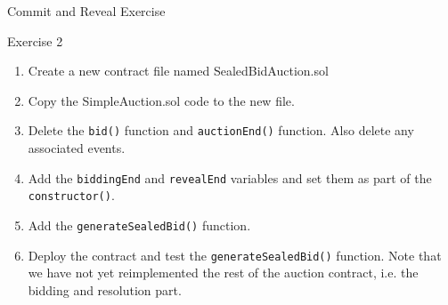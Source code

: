 \documentclass[]{beamer}
\begin{document}
\begin{frame}{Commit and Reveal Exercise}

	\begin{exercise}{Exercise 2}
		\begin{enumerate}
			\item Create a new contract file named SealedBidAuction.sol
			\item Copy the SimpleAuction.sol code to the new file.
			\item Delete the \texttt{bid()} function and \texttt{auctionEnd()} function. Also delete any associated events.
			\item Add the \texttt{biddingEnd} and \texttt{revealEnd} variables and set them as part of the \texttt{constructor()}.
			\item Add the \texttt{generateSealedBid()} function.
			\item Deploy the contract and test the \texttt{generateSealedBid()} function. Note that we have not yet reimplemented the rest of the auction contract, i.e. the bidding and resolution part. 
		\end{enumerate}
	\end{exercise}
	
\end{frame}
\end{document}
